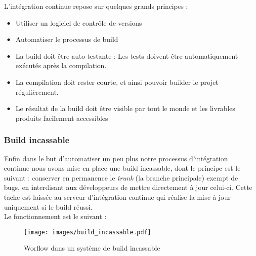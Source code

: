 L'intégration continue repose sur quelques grands principes :
\begin{itemize}
	\item Utiliser un logiciel de contrôle de versions
	\item Automatiser le processus de build
	\item La build doit être \og auto-testante \fg{} : Les tests doivent être automatiquement exécutés après la compilation.
	\item La compilation doit rester courte, et ainsi pouvoir builder le projet régulièrement.
	\item Le résultat de la build doit être visible par tout le monde et les livrables produits facilement accessibles\\
\end{itemize}


\subsubsection{Build incassable}

Enfin dans le but d'automatiser un peu plus notre processus d'intégration continue nous avons mise en place une build incassable, dont le principe est le suivant : conserver en permanence le \textit{trunk} (la branche principale) exempt de bugs, en interdisant aux développeurs de mettre directement à jour celui-ci. Cette tache est laissée au serveur d'intégration continue qui réalise la mise à jour uniquement si le build réussi.\\

Le fonctionnement est le suivant :\\
\begin{figure}
	\centering
		\texttt{[image: images/build\_incassable.pdf]}
	\caption{Worflow dans un système de build incassable}
\end{figure}

